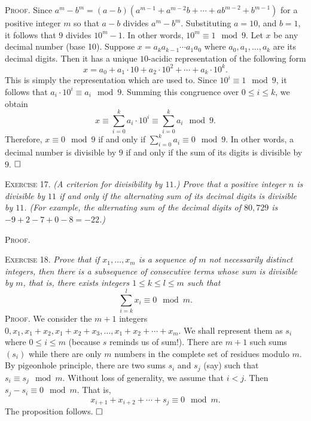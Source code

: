 \documentclass[11pt, leqno]{article}
\newcommand{\done}{\ensuremath{\hfill\square}}
\begin{document}
\textsc{Proof}. Since $a^m - b^m = (a-b)(a^{m-1} + a^{m-2}b + \cdots + ab^{m-2} + b^{m-1})$ for a positive integer $m$ so that $a - b$ divides $a^m - b^m$. Substituting $a = 10$, and $b = 1$, it follows that $9$ divides $10^m-1$. In other words, $10^m \equiv 1 \mod 9$. Let $x$ be any decimal number (base 10). Suppose $x = a_ka_{k-1}\cdots a_1a_0$ where $a_0, a_1, \ldots, a_k$ are its decimal digits. Then it has a unique $10$-acidic representation of the following form 
\begin{displaymath}
x = a_0 + a_1\cdot 10 + a_2 \cdot 10^2 + \cdots + a_k \cdot 10^k.
\end{displaymath}
This is simply the representation which are used to. Since $10^i \equiv 1 \mod 9$, it follows that $a_i \cdot 10^i \equiv a_i \mod 9$. Summing this congruence over $0\leq i \leq k$, we obtain 
\begin{displaymath}
x \equiv \sum_{i=0}^k a_i\cdot 10^i \equiv \sum_{i=0}^k a_i \mod 9.
\end{displaymath}
Therefore, $x \equiv 0 \mod 9$ if and only if $\sum_{i=0}^k a_i \equiv 0 \mod 9$. In other words, a decimal number is divisible by $9$ if and only if the sum of its digits is divisible by $9$. \done

\textsc{Exercise 17}. \emph{(A criterion for divisibility by $11$.) Prove that a positive integer $n$ is divisible by $11$ if and only if the alternating sum of its decimal digits is divisible by $11$. (For example, the alternating sum of the decimal digits of $80,729$ is $-9 + 2 -7 + 0 -8 = -22$.)}

\textsc{Proof}.

\textsc{Exercise 18}. \emph{Prove that if $x_1, \ldots, x_m$ is a sequence of $m$ not necessarily distinct integers, then there is a subsequence of consecutive terms whose sum is divisible by $m$, that is, there exists integers $1 \leq k \leq l \leq m$ such that 
\begin{displaymath}
\sum_{i=k}^l x_i \equiv 0 \mod m.
\end{displaymath}}\textsc{Proof}. We consider the $m+1$ integers $0, x_1, x_1+x_2, x_1+x_2+x_3, \ldots, x_1+x_2+\cdots + x_m$. We shall represent them as $s_i$ where $0 \leq i \leq m$ (because $s$ reminds us of sum!). There are $m+1$ such sums $(s_i)$ while there are only $m$ numbers in the complete set of residues modulo $m$. By pigeonhole principle, there are two sums $s_i$ and $s_j$ (say) such that $s_i \equiv s_j \mod m$. Without loss of generality, we assume that $i < j$. Then $s_j - s_i \equiv 0 \mod m$. That is, 
\begin{displaymath}
x_{i+1} + x_{i+2} + \cdots + s_j \equiv 0 \mod m.
\end{displaymath}
The proposition follows. \done
\end{document}

